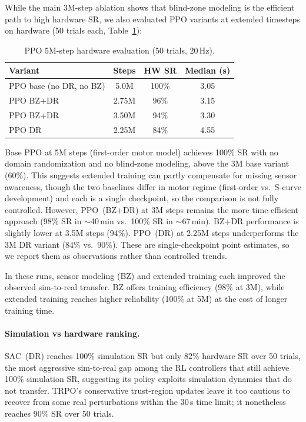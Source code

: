 While the main 3M-step ablation shows that blind-zone modeling is
the efficient path to high hardware SR, we also evaluated PPO
variants at extended timesteps on hardware (50 trials each,
Table~\ref{tab:ppo_5m_hw}):

\begin{table}[H]
\centering
\caption{PPO 5M-step hardware evaluation (50 trials, 20\,Hz).}
\label{tab:ppo_5m_hw}
\begin{tabular}{lccc}
\toprule
\textbf{Variant} & \textbf{Steps} & \textbf{HW SR} & \textbf{Median (s)} \\
\midrule
PPO base (no DR, no BZ)  & 5.0M  & 100\% & 3.05 \\
PPO BZ+DR                & 2.75M & 96\%  & 3.15 \\
PPO BZ+DR                & 3.50M & 94\%  & 3.30 \\
PPO DR                    & 2.25M & 84\%  & 4.55 \\
\bottomrule
\end{tabular}
\end{table}

Base PPO at 5M steps (first-order motor model) achieves 100\% SR with no
domain randomization and no blind-zone modeling, above the 3M base
variant (60\%). This suggests extended training can partly compensate for
missing sensor awareness, though the two baselines differ in motor regime
(first-order vs.\ S-curve development) and each is a single checkpoint, so
the comparison is not fully controlled.
However, PPO~(BZ+DR) at 3M steps remains the more time-efficient
approach (98\% SR in $\sim$40\,min vs.\ 100\% SR in $\sim$67\,min).
BZ+DR performance is slightly lower at 3.5M steps (94\%). PPO~(DR) at
2.25M steps underperforms the 3M DR variant (84\% vs.\ 90\%). These are
single-checkpoint point estimates, so we report them as observations rather
than controlled trends.

\noindent In these runs, sensor modeling (BZ) and extended training
each improved the observed sim-to-real transfer. BZ
offers training efficiency (98\% at 3M), while extended training
reaches higher reliability (100\% at 5M) at the cost of longer
training time.

\paragraph{Simulation vs hardware ranking.}
SAC~(DR) reaches 100\% simulation SR but only 82\% hardware SR over
50 trials, the most aggressive sim-to-real gap among the RL controllers
that still achieve 100\% simulation SR, suggesting its policy exploits
simulation dynamics that do not transfer.
TRPO's conservative trust-region updates leave it too cautious to
recover from some real perturbations within the 30\,s time limit;
it nonetheless reaches 90\% SR over 50 trials.

